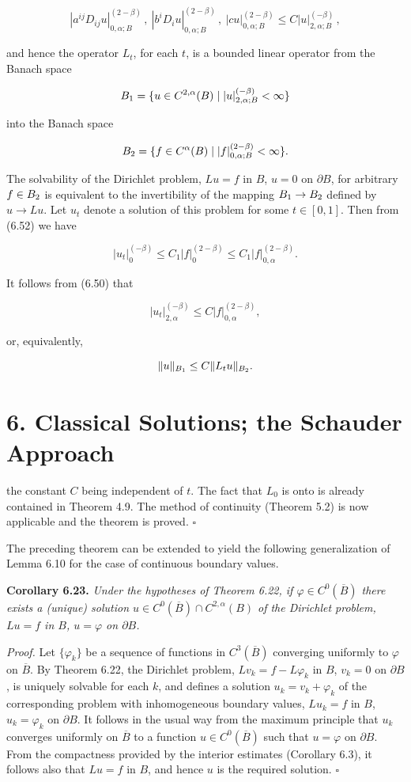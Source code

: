 \[
|a^{ij}D_{ij}u|_{0,\alpha;B}^{(2-\beta)}\,,\ |b^{i}D_{i}u|_{0,\alpha;B}^{(2-\beta)}\,,\ |cu|_{0,\alpha;B}^{(2-\beta)}\le C|u|_{2,\alpha;B}^{(-\beta)}\,,
\]

and hence the operator \(L_{t}\), for each \(t\), is a bounded linear operator from the Banach
space

\[
B_{1}=\{u\in C^{2,\alpha}(B)\mid |u|_{2,\alpha;B}^{(-\beta)}<\infty\}
\]

into the Banach space

\[
B_{2}=\{f\in C^{\alpha}(B)\mid |f|_{0,\alpha;B}^{(2-\beta)}<\infty\}.
\]

The solvability of the Dirichlet problem, \(Lu=f\) in \(B\), \(u=0\) on \(\partial B\), for arbitrary
\(f\in B_{2}\) is equivalent to the invertibility of the mapping \(B_{1}\to B_{2}\) defined by \(u\to Lu\).
Let \(u_{t}\) denote a solution of this problem for some \(t\in[0,1]\). Then from (6.52) we have

\[
|u_{t}|_{0}^{(-\beta)}\le C_{1}|f|_{0}^{(2-\beta)}\le C_{1}|f|_{0,\alpha}^{(2-\beta)}.
\]

It follows from (6.50) that

\[
|u_{t}|_{2,\alpha}^{(-\beta)}\le C|f|_{0,\alpha}^{(2-\beta)},
\]

or, equivalently,

\[
\|u\|_{B_{1}}\le C\|L_{t}u\|_{B_{2}}.
\]


\section*{6. Classical Solutions; the Schauder Approach}

the constant $C$ being independent of $t$. The fact that $L_0$ is onto is already contained in Theorem 4.9. The method of continuity (Theorem 5.2) is now applicable and the theorem is proved. $\square$

The preceding theorem can be extended to yield the following generalization of Lemma 6.10 for the case of continuous boundary values.

\textbf{Corollary 6.23.} \textit{Under the hypotheses of Theorem 6.22, if $\varphi \in C^0(\overline{B})$ there exists a (unique) solution $u \in C^0(\overline{B}) \cap C^{2,\alpha}(B)$ of the Dirichlet problem, $Lu=f$ in $B$, $u=\varphi$ on $\partial B$.}

\textit{Proof.} Let $\{\varphi_k\}$ be a sequence of functions in $C^3(\overline{B})$ converging uniformly to $\varphi$ on $\overline{B}$. By Theorem 6.22, the Dirichlet problem, $Lv_k=f-L\varphi_k$ in $B$, $v_k=0$ on $\partial B$, is uniquely solvable for each $k$, and defines a solution $u_k=v_k+\varphi_k$ of the corresponding problem with inhomogeneous boundary values, $Lu_k=f$ in $B$, $u_k=\varphi_k$ on $\partial B$. It follows in the usual way from the maximum principle that $u_k$ converges uniformly on $\overline{B}$ to a function $u \in C^0(\overline{B})$ such that $u=\varphi$ on $\partial B$. From the compactness provided by the interior estimates (Corollary 6.3), it follows also that $Lu=f$ in $B$, and hence $u$ is the required solution. $\square$

